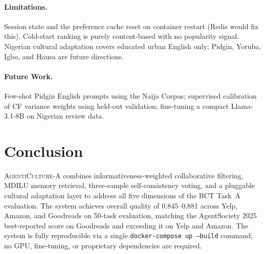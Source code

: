 \documentclass[11pt]{article}
\newcommand{\system}{\textsc{AgentiCulture}\xspace}
\begin{document}
\paragraph{Limitations.}
Session state and the preference cache reset on container restart (Redis
would fix this).
Cold-start ranking is purely content-based with no popularity signal.
Nigerian cultural adaptation covers educated urban English only;
Pidgin, Yoruba, Igbo, and Hausa are future directions.

\paragraph{Future Work.}
Few-shot Pidgin English prompts using the Naija Corpus; supervised calibration
of CF variance weights using held-out validation; fine-tuning a compact
Llama-3.1-8B on Nigerian review data.

\section{Conclusion}

\system-A combines informativeness-weighted collaborative filtering, MDILU
memory retrieval, three-sample self-consistency voting, and a pluggable cultural
adaptation layer to address all five dimensions of the BCT Task~A evaluation.
The system achieves overall quality of 0.845--0.881 across Yelp, Amazon, and
Goodreads on 50-task evaluation, matching the AgentSociety 2025 best-reported
score on Goodreads and exceeding it on Yelp and Amazon.
The system is fully reproducible via a single \texttt{docker-compose up --build}
command; no GPU, fine-tuning, or proprietary dependencies are required.



\end{document}
